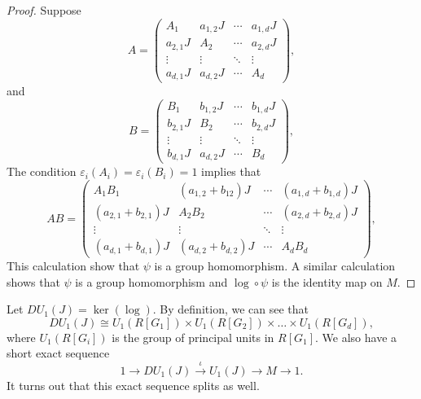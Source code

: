 \documentclass[12pt, a4paper]{amsart}
\numberwithin{equation}{section} %
\theoremstyle{plain}
\theoremstyle{definition}
\theoremstyle{plain}
\theoremstyle{remark}
\newcommand{\ones}{J}
\begin{document}
\begin{proof}
Suppose 
\begin{equation*}
A=\left(\begin{array}{c|c|c|c}
A_1 & a_{1,2}\ones & \cdots & a_{1,d}\ones \\
\hline
a_{2,1}\ones & A_2 & \cdots & a_{2,d}\ones \\
\hline
\vdots & \vdots & \ddots & \vdots \\
\hline
a_{d,1}\ones & a_{d,2}\ones & \cdots & A_d
\end{array}\right),
\end{equation*}
and 
\begin{equation*}
B=\left(\begin{array}{c|c|c|c}
B_1 & b_{1,2}\ones & \cdots & b_{1,d}\ones \\
\hline
b_{2,1}\ones & B_2 & \cdots & b_{2,d}\ones \\
\hline
\vdots & \vdots & \ddots & \vdots \\
\hline
b_{d,1}\ones & a_{d,2}\ones & \cdots & B_d
\end{array}\right),
\end{equation*}
The condition $\varepsilon_i(A_i)=\varepsilon_i(B_i)=1$ implies that 
\begin{equation} \label{eq:multiplicationAB}
AB=\left(\begin{array}{c|c|c|c}
A_1B_1 & (a_{1,2}+b_{12})\ones & \cdots & (a_{1,d}+b_{1,d})\ones \\
\hline
(a_{2,1}+b_{2,1})\ones & A_2B_2 & \cdots & (a_{2,d}+b_{2,d}) \ones \\
\hline
\vdots & \vdots & \ddots & \vdots \\
\hline
(a_{d,1}+b_{d,1}) \ones & (a_{d,2}+b_{d,2})\ones & \cdots & A_d B_d
\end{array}\right),
\end{equation}
This calculation show that $\psi$ is a group homomorphism. A similar calculation shows that $\psi$ is a group homomorphism and $\log \circ \psi$ is the identity map on $M.$
\end{proof}
Let $DU_1(J) = \ker(\log)$. By definition, we can see that 
\[ DU_1(J) \cong U_1(R[G_1]) \times U_1(R[G_2]) \times \ldots \times U_1(R[G_d]) ,\]
where $U_1(R[G_i])$ is the group of principal units in $R[G_1].$ We also have a short exact sequence 
\begin{equation} \label{eq:unit2}
1 \to DU_1(J) \xrightarrow{\iota} U_1(J) \to M \to 1.     
\end{equation}
It turns out that this exact sequence splits as well. 
\end{document}
